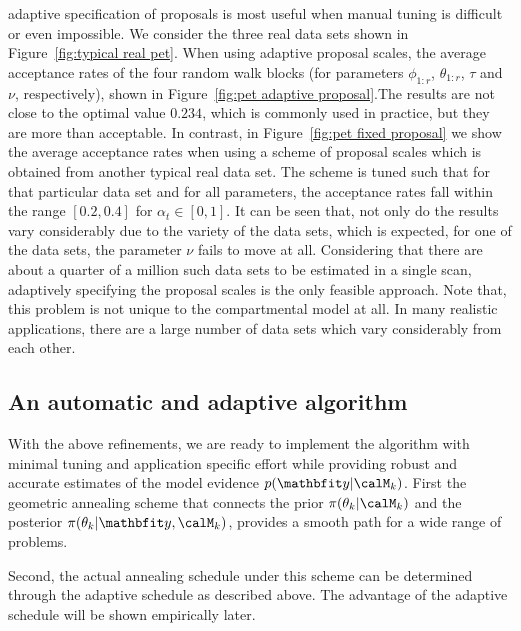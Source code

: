 


 adaptive specification of proposals is most useful when manual tuning is difficult or even impossible. We consider the three real \pet data sets shown in Figure~\ref{fig:typical real pet}. When using adaptive proposal scales, the average acceptance rates of the four random walk blocks (for parameters $\phi_{1:r}$, $\theta_{1:r}$, $\tau$ and $\nu$, respectively),  shown in Figure~\ref{fig:pet adaptive proposal}.The results are not close to the optimal value $0.234$, which is commonly used in practice, but they are more than acceptable. In contrast, in Figure~\ref{fig:pet fixed proposal} we show the average acceptance rates when using a scheme of proposal scales which is obtained from another typical real \pet data set. The scheme is tuned such that for that particular data set and for all parameters, the acceptance rates fall within the range $[0.2, 0.4]$ for $\alpha_t \in [0, 1]$. It can be seen that, not only do the results vary considerably due to the variety of the data sets, which is expected,  for one of the data sets, the parameter $\nu$ fails to move at all. Considering that there are about a quarter of a million such data sets to be estimated in a single \pet scan, adaptively specifying the proposal scales is the only feasible approach. Note that, this problem is not unique to the \pet compartmental model at all. In many realistic applications, there are a large number of data sets which vary considerably from each other.

\subsection{An automatic and adaptive algorithm}
\label{sub:An automatic and adaptive algorithm}

With the above refinements, we are ready to implement the \smc[2] algorithm with minimal tuning and application specific effort while providing robust and accurate estimates of the model evidence $p(\data|\calM_k)$. First the geometric annealing scheme that connects the prior $\pi(\theta_k|\calM_k)$ and the posterior $\pi(\theta_k|\data,\calM_k)$, provides a smooth path for a wide range of problems.

Second, the actual annealing schedule under this scheme can be determined through the adaptive schedule as described above. The advantage of the adaptive schedule will be shown empirically later.

